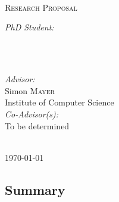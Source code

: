 \documentclass[a4paper,11pt]{article}
\begin{document}
\begin{titlepage}
\HRule \\[0.6cm]
\huge \textbf{\thetitle}\\[0.4cm]
\HRule \\[0.4cm]

\textsc{\Large Research Proposal}


\vspace*{\fill}

\begin{minipage}{0.4\textwidth}
\begin{flushleft} \large
\emph{PhD Student:}\\
\theauthor \\ 
\end{flushleft}
\end{minipage}
~
\begin{minipage}{0.5\textwidth}
\begin{flushright} \large
\emph{Advisor:} \\
Simon \textsc{Mayer} \\
Institute of Computer Science\\[0.5cm]
\emph{Co-Advisor(s):} \\
To be determined
\end{flushright}
\end{minipage}\\[2cm]


{\large \today}

\vfill %

\end{titlepage}

\subsection*{Summary}

\lipsum

\newpage









\end{document}
